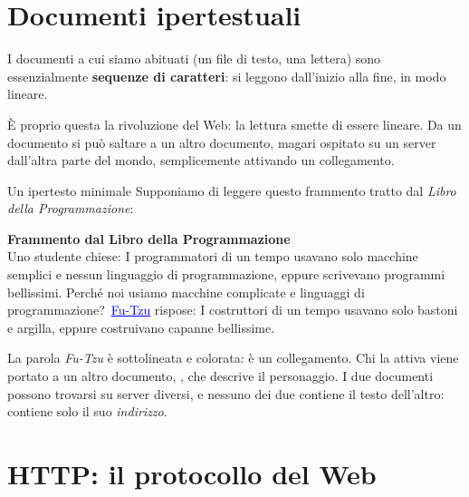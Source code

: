 \section{Documenti ipertestuali}

I documenti a cui siamo abituati (un file di testo, una lettera) sono
essenzialmente \textbf{sequenze di caratteri}: si leggono dall'inizio alla fine,
in modo lineare.


È proprio questa la rivoluzione del Web: la lettura smette di essere lineare. Da
un documento si può saltare a un altro documento, magari ospitato su un server
dall'altra parte del mondo, semplicemente attivando un collegamento.

\begin{esempio}{Un ipertesto minimale}
Supponiamo di leggere questo frammento tratto dal \textit{Libro della
Programmazione}:

\begin{browser}
  {\Lora\bfseries\large Frammento dal Libro della Programmazione}\\[6pt]
  Uno studente chiese: \guillemotleft I programmatori di un tempo usavano solo macchine
  semplici e nessun linguaggio di programmazione, eppure scrivevano programmi
  bellissimi. Perché noi usiamo macchine complicate e linguaggi di
  programmazione?\guillemotright\ \textcolor{blue}{\underline{Fu-Tzu}} rispose: \guillemotleft I costruttori
  di un tempo usavano solo bastoni e argilla, eppure costruivano capanne
  bellissime\guillemotright.
\end{browser}

La parola \textit{Fu-Tzu} è sottolineata e colorata: è un collegamento. Chi la
attiva viene portato a un altro documento, , che descrive il
personaggio. I due documenti possono trovarsi su server diversi, e nessuno dei
due contiene il testo dell'altro: contiene solo il suo \textit{indirizzo}.
\end{esempio}

\section{HTTP: il protocollo del Web}


